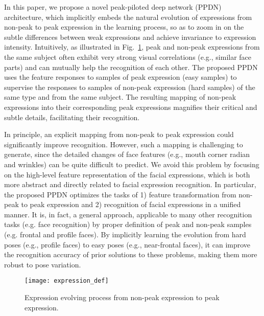 \documentclass[runningheads]{llncs}
\begin{document}
In this paper, we propose a novel peak-piloted deep network (PPDN) 
architecture, which  implicitly embeds the natural evolution of expressions
from non-peak to peak expression in the learning 
process, so as to zoom in on the subtle differences between weak expressions
and achieve invariance to expression intensity.  Intuitively, 
as illustrated in Fig.~\ref{fig:evolve}, peak and non-peak expressions from 
the same subject often exhibit very strong visual correlations (e.g., similar 
face parts) and can mutually help the recognition of each other. The 
proposed PPDN uses the feature responses to samples of peak expression 
(easy samples) to supervise the responses to samples of non-peak 
expression (hard samples) of the same type and from the same subject. 
The resulting mapping of non-peak expressions into their corresponding 
peak expressions magnifies their critical and subtle details, facilitating
their recognition.

In principle, an explicit mapping from non-peak to peak expression 
could significantly improve recognition. However, such a mapping is
challenging to generate, since the detailed changes of face features 
(e.g., mouth corner radian and wrinkles) can be quite difficult to predict. 
We avoid this problem by focusing on 
the high-level feature representation of the facial expressions, which
is both more abstract and directly related to facial expression recognition. 
In particular, the proposed PPDN optimizes the tasks of 1) feature 
transformation from non-peak to peak expression and 2) recognition of facial 
expressions in a unified manner. It is, in fact, a general approach,
applicable to many other recognition tasks (e.g. face recognition) by 
proper definition of peak and non-peak samples (e.g. frontal and 
profile faces). By implicitly learning the evolution from hard poses (e.g., profile faces) to  easy poses 
(e.g., near-frontal faces), it
can improve the recognition accuracy of prior solutions to these
problems, making them more robust to pose variation.



\begin{figure}[t]
\centering
\texttt{[image: expression\_def]}
\caption{Expression evolving process from non-peak expression to peak expression. %
	}
\label{fig:evolve}
\end{figure}
\end{document}

